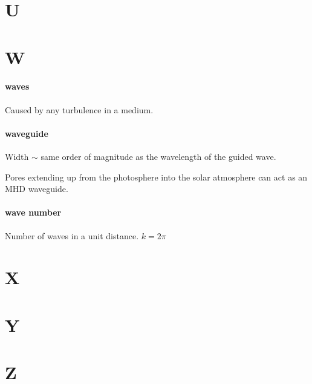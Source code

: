 \documentclass[12pt]{article}
\begin{document}
\section*{U}
\section*{W}

\paragraph{waves}
Caused by any turbulence in a medium.

\paragraph{waveguide}
\begin{itemize*}
    \item Width $\sim$ same order of magnitude as the wavelength of
        the guided wave.
    \item Pores extending up from the photosphere
        into the solar atmosphere can act as an
        MHD waveguide.
\end{itemize*}

\paragraph{wave number}
Number of waves in a unit distance.
$ k = 2\pi $

\section*{X}
\section*{Y}
\section*{Z}
\end{document}
